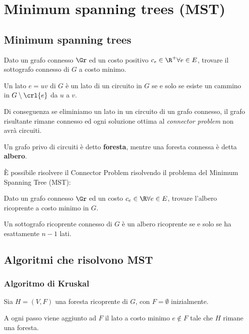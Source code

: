 \documentclass[\main/main.tex]{subfiles}
\begin{document}
\chapter{Minimum spanning trees (MST)}
\section{Minimum spanning trees}
\begin{problem}
Dato un grafo connesso \(\Gr \) ed un costo positivo \(c_e \in \R^+ \forall e \in E\), trovare il sottografo connesso di \(G\) a costo minimo.
\end{problem}
\begin{lemma}
  Un lato \(e = uv\) di \(G\) è un lato di un circuito in \(G\) se e solo se esiste un cammino in \(G \setminus \crl{e}\) da \(u\) a \(v\).
\end{lemma}
Di conseguenza se eliminiamo un lato in un circuito di un grafo connesso, il grafo risultante rimane connesso ed ogni soluzione ottima al \textit{connector problem} non avrà circuiti.
\begin{definition}
  Un grafo privo di circuiti è detto \textbf{foresta}, mentre una foresta connessa è detta \textbf{albero}.
\end{definition}
È possibile risolvere il Connector Problem risolvendo il problema del Minimum Spanning Tree (MST):
\begin{problem}
Dato un grafo connesso \(\Gr \) ed un costo \(c_e \in \R \forall e \in E\), trovare l'albero ricoprente a costo minimo in \(G\).
\end{problem}
\begin{lemma}
  Un sottografo ricoprente connesso di \(G\) è un albero ricoprente se e solo se ha esattamente \(n -1\) lati.
\end{lemma}

\section{Algoritmi che risolvono MST}
\subsection{Algoritmo di Kruskal}
Sia \(H = (V, F)\) una foresta ricoprente di \(G\), con \(F=\emptyset \) inizialmente.

A ogni passo viene aggiunto ad \(F\) il lato a costo minimo \(e \not\in F\) tale che \(H\) rimane una foresta.
\end{document}
